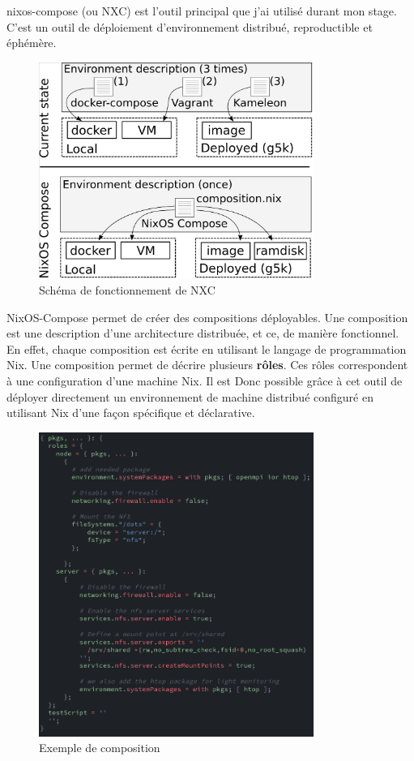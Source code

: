 \documentclass[a4paper,french,12pt, titlepage]{article}
\begin{document}
\Gls{nixos-compose} (ou NXC) est l'outil principal que j'ai utilisé
durant mon stage. C'est un outil de déploiement d'environnement
distribué, reproductible et éphémère.\newline

\begin{figure}[h]
\centering
\includegraphics[width=0.8\textwidth,height=0.8\textheight,keepaspectratio]{images/shema-nxc.png}
\caption{Schéma de fonctionnement de NXC}
\end{figure}

NixOS-Compose permet de créer des compositions déployables. Une
composition est une description d'une architecture distribuée, et ce, de
manière fonctionnel. En effet, chaque composition est écrite en
utilisant le langage de programmation Nix. Une composition permet de
décrire plusieurs \textbf{rôles}. Ces rôles correspondent à une
configuration d'une machine Nix. Il est Donc possible grâce à cet outil
de déployer directement un environnement de machine distribué configuré
en utilisant Nix d'une façon spécifique et déclarative.\newline

\begin{figure}[h]
\centering
\includegraphics[width=0.8\textwidth,height=0.8\textheight,keepaspectratio]{images/coposition-nfs.png}
\caption{Exemple de composition}
\end{figure}
\end{document}
